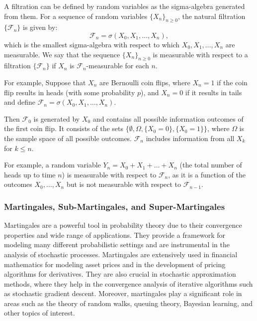 \documentclass[letter,11pt]{article}
\begin{document}
A filtration can be defined by random variables as the sigma-algebra generated from them. For a sequence of random variables \( \{X_n\}_{n \geq 0} \), the natural filtration \( \{\mathcal{F}_n\} \) is given by:
\[
\mathcal{F}_n = \sigma(X_0, X_1, \ldots, X_n),
\]
which is the smallest sigma-algebra with respect to which \( X_0, X_1, \ldots, X_n \) are measurable. We say that the sequence \( \{X_n\}_{n \geq 0} \) is measurable with respect to a filtration  \( \{\mathcal{F}_n\} \) if $X_{n}$ is $\mathcal{F}_{n}$-measurable for each $n$.  

For example, Suppose that \(X_n\) are Bernoulli coin flips, where \(X_n = 1\) if the coin flip results in heads (with some probability $p$), and \(X_n = 0\) if it results in tails and define 
$ \mathcal{F}_n = \sigma(X_0, X_1, \ldots, X_n)$.


  Then \(\mathcal{F}_0\) is generated by \(X_0\) and contains all possible information outcomes of the first coin flip. It consists of the sets \(\{\emptyset, \Omega, \{X_0 = 0\}, \{X_0 = 1\}\}\), where \(\Omega\) is the sample space of all possible outcomes.  \(\mathcal{F}_n\) includes information from all \(X_k\) for \(k \leq n\).  

For example, a random variable \(Y_n = X_0 + X_1 + \ldots + X_n\) (the total number of heads up to time \(n\)) is measurable with respect to \(\mathcal{F}_n\), as it is a function of the outcomes \(X_0, \ldots, X_n\) but is not measurable with respect to \(\mathcal{F}_{n-1}\). 




\subsubsection{Martingales, Sub-Martingales, and Super-Martingales}

Martingales are a powerful tool in probability theory due to their convergence properties and wide range of applications. They provide a framework for modeling many different probabilistic settings and are instrumental in the analysis of stochastic processes. Martingales are extensively used in financial mathematics for modeling asset prices and in the development of pricing algorithms for derivatives. They are also crucial in stochastic approximation methods, where they help in the convergence analysis of iterative algorithms such as stochastic gradient descent. Moreover, martingales play a significant role in areas such as the theory of random walks, queuing theory, Bayesian learning, and other topics of interest. 
\end{document}
